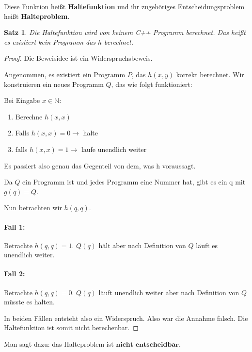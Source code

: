 \documentclass{article}
\newcommand{\N}{\mathbb{N}}%
\newtheorem{thm}{Satz}
\begin{document}
\medskip

Diese Funktion heißt \textbf{Haltefunktion} und ihr zugehöriges Entscheidungsproblem heißt \textbf{Halteproblem}.

\begin{thm}
    Die Haltefunktion wird von keinem C++ Programm berechnet. Das heißt es existiert kein Programm das $h$ berechnet.
\end{thm}

\begin{proof}
    Die Beweisidee ist ein Widerspruchsbeweis.
    
    Angenommen, es existiert ein Programm $P$, das $h(x,y)$ korrekt berechnet. Wir konstruieren ein neues Programm $Q$, das wie folgt funktioniert:

    Bei Eingabe $x \in \N$:
    \begin{enumerate}
        \item Berechne $h(x,x)$
        \item Falls \(h(x,x) = 0 \rightarrow \) halte
        \item falls \(h(x,x) = 1\rightarrow \) laufe unendlich weiter 
    \end{enumerate}
    
   
    Es passiert also genau das Gegenteil von dem, was h voraussagt.

    Da $Q$ ein Programm ist und jedes Programm eine Nummer hat, gibt es ein q mit \( g(q) = Q\).

    Nun betrachten wir $h(q,q)$.
    \paragraph{Fall 1:} Betrachte $h(q,q) = 1$. 
    $Q(q)$ hält aber nach Definition von $Q$ läuft es unendlich weiter.

    \paragraph{Fall 2:} Betrachte $h(q,q) = 0$.
    $Q(q)$ läuft unendlich weiter aber nach Definition von $Q$ müsste es halten.
\medskip

    In beiden Fällen entsteht also ein Widerspruch. Also war die Annahme falsch. Die Haltefunktion ist somit nicht berechenbar.
\end{proof}

Man sagt dazu: das Halteproblem ist $\textbf{nicht entscheidbar}$.
\end{document}
